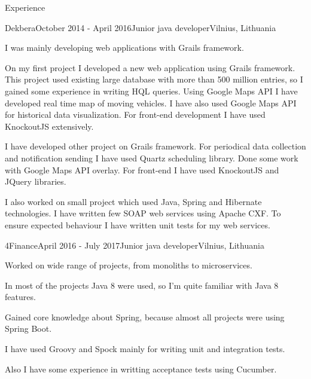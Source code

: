 \documentclass[]{resume} %
\begin{document}
\begin{rSection}{Experience}

    \begin{rSubsection}{Dekbera}{October 2014 - April 2016}{Junior java developer}{Vilnius, Lithuania}
        \item I was mainly developing web applications with Grails framework.

        \item On my first project I developed a new web application using Grails framework.
        This project used existing large database with more than 500 million entries, so I gained some experience in writing HQL queries.
        Using Google Maps API I have developed real time map of moving vehicles.
        I have also used Google Maps API for historical data visualization.
        For front-end development I have used KnockoutJS extensively.

        \item I have developed other project on Grails framework.
        For periodical data collection and notification sending I have used Quartz scheduling library.
        Done some work with Google Maps API overlay.
        For front-end I have used KnockoutJS and JQuery libraries.

        \item I also worked on small project which used Java, Spring and Hibernate technologies.
        I have written few SOAP web services using Apache CXF.
        To ensure expected behaviour I have written unit tests for my web services.

    \end{rSubsection}

    \begin{rSubsection}{4Finance}{April 2016 - July 2017}{Junior java developer}{Vilnius, Lithuania}
        \item Worked on wide range of projects, from monoliths to microservices.

        \item In most of the projects Java 8 were used, so I'm quite familiar with Java 8 features.

        \item Gained core knowledge about Spring, because almost all projects were using Spring Boot.

        \item I have used Groovy and Spock mainly for writing unit and integration tests.

        \item Also I have some experience in writting acceptance tests using Cucumber.


\end{rSubsection}
\end{rSection}
\end{document}
